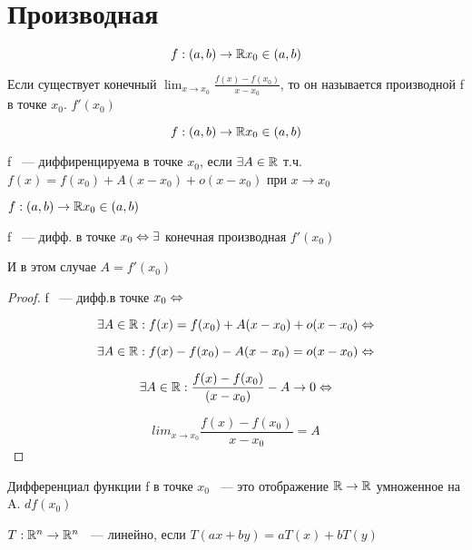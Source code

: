 \section{Производная}

\begin{Def}
 $$f:(a, b)\to \mathbb{R} x_0 \in (a, b)$$

 Если существует конечный $\lim_{x \to x_0} \frac{f(x) - f(x_0)}{x - x_0}$, то он называется производной f в точке $x_0$. $f'(x_0)$
\end{Def}

\begin{Def}
$$f:(a, b) \to \mathbb{R} x_0 \in (a, b)$$

f ~--- диффиренцируема в точке $x_0$, если $\exists A \in \mathbb{R}$ т.ч. $f(x) = f(x_0) + A(x - x_0) + o(x - x_0)$ при $x \to x_0$
\end{Def}

\begin{theorem}{}
$f:(a, b) \to \mathbb{R} x_0 \in (a, b)$

f ~--- дифф. в точке $x_0 \Leftrightarrow \exists$ конечная производная $f'(x_0)$

И в этом случае $A = f'(x_0)$ 
\end{theorem}

\begin{proof}
 f ~--- дифф.в точке $x_0 \Leftrightarrow$

 $$\exists A \in \mathbb{R}: f(x) = f(x_0) + A(x - x_0) + o(x - x_0) \Leftrightarrow $$

 $$\exists A \in \mathbb{R}: f(x) - f(x_0) - A(x - x_0) = o(x - x_0) \Leftrightarrow $$

 $$\exists A \in \mathbb{R}: \frac{f(x) - f(x_0)}{(x - x_0)} - A \to 0 \Leftrightarrow $$

 $$lim_{x \to x_0} \frac{f(x) - f(x_0)}{x - x_0} = A$$
\end{proof}

\begin{Def}
 Дифференциал функции f в точке $x_0$ ~--- это отображение $\mathbb{R} \to \mathbb{R}$ умноженное на A. $df(x_0)$
\end{Def}

$T:\mathbb{R}^n \to \mathbb{R}^n$ ~--- линейно, если $T(ax + by) = aT(x) + bT(y)$
